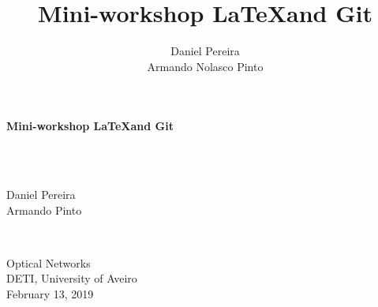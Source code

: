 \documentclass[usenames,dvipsnames,aspectratio=169]{beamer}
\title{Mini-workshop \LaTeX and Git}
\author{Daniel Pereira\\ Armando Nolasco Pinto}
\institute{Universidade de Aveiro}
\begin{document}
{
%
\begin{frame}
\color{black} \sffamily \noindent \large
\hspace*{1cm}
\begin{minipage}{10cm}
\vspace*{.4cm}
\begin{flushleft}
 \color{title} \sffamily \noindent \Large
\textbf{Mini-workshop \LaTeX and Git}
\end{flushleft}
\end{minipage}
\vspace*{.8cm}\\
%
~\\
\hspace*{1cm}
\begin{minipage}{3cm}
\color{author}
\large Daniel Pereira\\
Armando Pinto
\end{minipage}
%
\vspace*{.8cm}\\
\hspace*{1cm}
\begin{minipage}{6cm}
\color{title}
\large Optical Networks\\
DETI, University of Aveiro\\
February 13, 2019
\end{minipage}
\end{frame}
}


\end{document}
